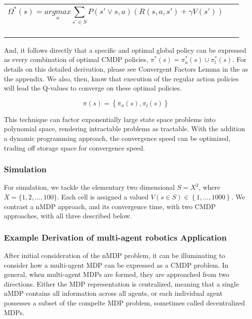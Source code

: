 \documentclass{article}
\begin{document}
\begin{flushleft}
\tablefirsthead{}
\tablehead{}
\tabletail{}
\tablelasttail{}
\begin{supertabular}{m{15.493cm}m{0.996cm}}
\begin{equation}
\Omega _{}^{\ast }(s)=\underset a{\mathit{argmax}}\sum _{s'{\in}S}^{}P\left(s'\vee s,a\right)\left(R\left(s,a,s'\right)+\mathit{\gamma V}\left(s'\right)\right)
\end{equation}
~
 &
~
\\
\end{supertabular}
\end{flushleft}
And, it follows directly that a specific and optimal global policy can be expressed as every combination of optimal CMDP policies,  $\pi _{}^{\ast }\left(s\right)=\pi _u^{\ast }\left(s\right){\cup}\pi _l^{\ast }\left(s\right)$. For details on this detailed derivation, please see Convergent Factors Lemma in the as the appendix. We also, then, know that execution of the regular action policies will lead the Q-values to converge on these optimal policies.

\begin{equation}
\pi _{}^{}\left(s\right)=\left\{\pi _u^{}\left(s\right),\pi _l^{}\left(s\right)\right\}
\end{equation}

\bigskip

This technique can factor exponentially large state space problems into polynomial space, rendering intractable problems as tractable. With the addition a dynamic programming approach, the convergence speed can be optimized, trading off storage space for convergence speed. 

\subsubsection{Simulation}
For simulation, we tackle the elementary two dimensional  $S=X^2$, where  $X=\{1,2,{\dots},100\}$. Each cell is assigned a valued  $V\left(s{\in}S\right){\in}\left\{1,{\dots},1000\right\}$. We contrast a nMDP approach, and its convergence time, with two CMDP approaches, with all three described below.

\subsubsection{Example Derivation of multi-agent robotics Application}
After initial consideration of the nMDP problem, it can be illuminating to consider how a multi-agent MDP can be expressed as a CMDP problem. In general, when multi-agent MDPs are formed, they are approached from two directions. Either the MDP representation is centralized, meaning that a single nMDP contains all information across all agents, or each individual agent possesses a subset of the compelte MDP problem, sometimes called decentralized MDPs. 
\end{document}
